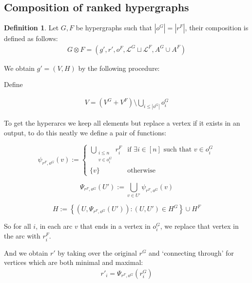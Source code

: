 \documentclass[12pt]{article}
\theoremstyle{definition}
\newtheorem{definition}{Definition}[section]
\newcommand{\defeq}{\vcentcolon=}
\newcommand{\1}{\mathbbm{1}}
\renewcommand{\L}{\mathcal{L}}
\begin{document}
\subsection{Composition of ranked hypergraphs}
\begin{definition}
Let $G, F$ be hypergraphs such that $|o^G| = |r^F|$, their composition is defined as follows:
\begin{align}
    G\otimes F = (g', r', o^F, \L^G\sqcup \L^F, A^G\cup A^F)
\end{align}

We obtain $g' = (V,H)$ by the following procedure:

Define 

\begin{align*}
    V = (V^G + V^F) \setminus \bigcup_{i\leq |o^G|}o^G_i
\end{align*}

To get the hyperarcs we keep all elements but replace a vertex if it exists in an output, to do this neatly we define a pair of functions:

\[
\psi_{r^F, o^G}(v) := 
\begin{cases}
\displaystyle\bigcup_{\substack{i\leq  n \\ v \in o^G_i}} r^F_i & \text{if } \exists i \in [n] \text{ such that } v \in o^G_i \\
\{v\} & \text{otherwise}
\end{cases}
\]

\[
\Psi_{r^F, o^G}(U') := \bigcup_{v \in U'} \psi_{r^F, o^G}(v)
\]

\[
H := \left\{ \left(U, \Psi_{r^F, o^G}(U')\right) : (U, U') \in H^G \right\} \cup H^F
\]

So for all $i$, in each arc $v$ that ends in a vertex in $o_i^G$, we replace that vertex in the arc with $r_i^F$. 

And we obtain $r'$ by taking over the original $r^G$ and `connecting through' for vertices which are both minimal and maximal:
\begin{align*}
    r'_i = \Psi_{r^F, o^G}(r^G_i)
\end{align*}
\end{definition}
\end{document}
